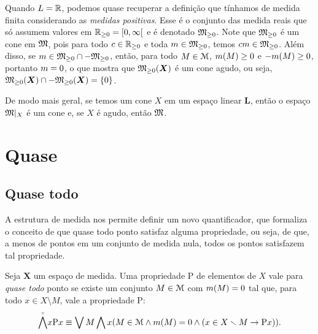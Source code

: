 Quando $L = \mathbb{R}$, podemos quase recuperar a definição que tínhamos de medida finita considerando as \emph{medidas positivas}. Esse é o conjunto das medida reais que só assumem valores em $\mathbb{R}_{\geq 0} = \left[{0},{\infty}\right[$ e é denotado $\mathfrak{M}_{\geq 0}$. Note que $\mathfrak{M}_{\geq 0}$ é um cone em $\mathfrak{M}$, pois para todo $c \in \mathbb{R}_{\geq 0}$ e toda $m \in \mathfrak{M}_{\geq 0}$, temos $cm \in \mathfrak{M}_{\geq 0}$. Além disso, se $m \in \mathfrak{M}_{\geq 0} \cap -\mathfrak{M}_{\geq 0}$, então, para todo $M \in \mathcal{M}$, $m(M) \geq 0$ e $-m(M) \geq 0$, portanto $m=0$, o que mostra que $\mathfrak{M}_{\geq 0}(\bm X)$ é um cone agudo, ou seja, $\mathfrak{M}_{\geq 0}(\bm X) \cap -\mathfrak{M}_{\geq 0}(\bm X) = \{0\}$.

De modo mais geral, se temos um cone $X$ em um espaço linear $\bm L$, então o espaço $\mathfrak{M}|_X$ é um cone e, se $X$ é agudo, então $\mathfrak{M}$.


















\section{Quase}

\subsection{Quase todo}

A estrutura de medida nos permite definir um novo quantificador, que formaliza o conceito de que quase todo ponto satisfaz alguma propriedade, ou seja, de que, a menos de pontos em um conjunto de medida nula, todos os pontos satisfazem tal propriedade.

\begin{definition}
Seja $\bm X$ um espaço de medida. Uma propriedade $\mathrm{P}$ de elementos de $X$ vale para \emph{quase todo} ponto se existe um conjunto $M \in \mathcal{M}$ com $m(M)=0$ tal que, para todo $x \in X \setminus M$, vale a propriedade $\mathrm{P}$:
	\begin{equation*}
	\qforall x \mathrm{P}x \equiv \exists M \forall x (M \in \mens \wedge \med(M)=0 \wedge (x \in X \setminus M \rightarrow \mathrm{P}x)).
	\end{equation*}
\end{definition}

